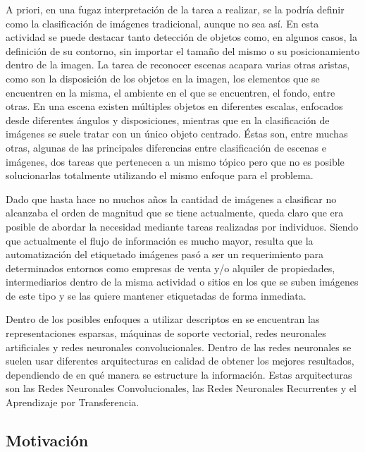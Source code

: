 A priori, en una fugaz interpretación de la tarea a realizar, se la podría definir como la clasificación de imágenes tradicional, aunque no sea así. En esta actividad se puede destacar tanto detección de objetos como, en algunos casos, la definición de su contorno, sin importar el tamaño del mismo o su posicionamiento dentro de la imagen. La tarea de reconocer escenas acapara varias otras aristas, como son la disposición de los objetos en la imagen, los elementos que se encuentren en la misma, el ambiente en el que se encuentren, el fondo, entre otras. En una escena existen múltiples objetos en diferentes escalas, enfocados desde diferentes ángulos y disposiciones, mientras que en la clasificación de imágenes se suele tratar con un único objeto centrado. Éstas son, entre muchas otras, algunas de las principales diferencias entre clasificación de escenas e imágenes, dos tareas que pertenecen a un mismo tópico pero que no es posible solucionarlas totalmente utilizando el mismo enfoque para el problema.

Dado que hasta hace no muchos años la cantidad de imágenes a clasificar no alcanzaba el orden de magnitud que se tiene actualmente, queda claro que era posible de abordar la necesidad mediante tareas realizadas por individuos. Siendo que actualmente el flujo de información es mucho mayor, resulta que la automatización del etiquetado imágenes pasó a ser un requerimiento para determinados entornos como empresas de venta y/o alquiler de propiedades, intermediarios dentro de la misma actividad o sitios en los que se suben imágenes de este tipo y se las quiere mantener etiquetadas de forma inmediata.

Dentro de los posibles enfoques a utilizar descriptos en \cite{comparation_techniques} se encuentran las representaciones esparsas, máquinas de soporte vectorial, redes neuronales artificiales y redes neuronales convolucionales. Dentro de las redes neuronales se suelen usar diferentes arquitecturas en calidad de obtener los mejores resultados, dependiendo de en qué manera se estructure la información. Estas arquitecturas son las Redes Neuronales Convolucionales, las Redes Neuronales Recurrentes y el Aprendizaje por Transferencia.


\subsection{Motivación}\label{sec:motivacion}

